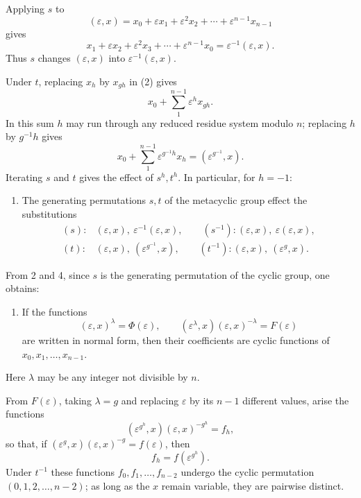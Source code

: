 \documentclass[11pt]{article}
\begin{document}
Applying $s$ to
\begin{equation}\tag{2}
  (\varepsilon,x)=x_0+\varepsilon x_1+\varepsilon^2x_2+\cdots+\varepsilon^{n-1}x_{n-1}
\end{equation}
gives
\[
  x_1+\varepsilon x_2+\varepsilon^2x_3+\cdots+\varepsilon^{n-1}x_0
  =\varepsilon^{-1}(\varepsilon,x).
\]
Thus $s$ changes $(\varepsilon,x)$ into $\varepsilon^{-1}(\varepsilon,x)$.

Under $t$, replacing $x_h$ by $x_{gh}$ in (2) gives
\begin{equation}\tag{3}
  x_0+\sum_{1}^{n-1}\varepsilon^h x_{gh}.
\end{equation}
In this sum $h$ may run through any reduced residue system modulo $n$; replacing $h$ by $g^{-1}h$ gives
\[
  x_0+\sum_{1}^{n-1}\varepsilon^{g^{-1}h}x_h=(\varepsilon^{g^{-1}},x).
\]
Iterating $s$ and $t$ gives the effect of $s^h,t^h$. In particular, for $h=-1$:

\begin{enumerate}[resume,label=\arabic*.]
\item The generating permutations $s,t$ of the metacyclic group effect the substitutions
\[
\begin{array}{ll}
(s):&(\varepsilon,x),\ \varepsilon^{-1}(\varepsilon,x),\qquad
(s^{-1}): (\varepsilon,x),\ \varepsilon(\varepsilon,x),\\[2mm]
(t):&(\varepsilon,x),\ (\varepsilon^{g^{-1}},x),\qquad
(t^{-1}): (\varepsilon,x),\ (\varepsilon^{g},x).
\end{array}
\]
\end{enumerate}

From 2 and 4, since $s$ is the generating permutation of the cyclic group, one obtains:

\begin{enumerate}[resume,label=\arabic*.]
\item If the functions
\begin{equation}\tag{4}
  (\varepsilon,x)^\lambda=\Phi(\varepsilon),\qquad
  (\varepsilon^\lambda,x)(\varepsilon,x)^{-\lambda}=F(\varepsilon)
\end{equation}
are written in normal form, then their coefficients are cyclic functions of $x_0,x_1,\ldots,x_{n-1}$.
\end{enumerate}
Here $\lambda$ may be any integer not divisible by $n$.

From $F(\varepsilon)$, taking $\lambda=g$ and replacing $\varepsilon$ by its $n-1$ different values, arise the functions
\begin{equation}\tag{5}
  (\varepsilon^{g^h},x)(\varepsilon,x)^{-g^h}=f_h,
\end{equation}
so that, if $(\varepsilon^g,x)(\varepsilon,x)^{-g}=f(\varepsilon)$, then
\begin{equation}\tag{6}
  f_h=f(\varepsilon^{g^h}).
\end{equation}
Under $t^{-1}$ these functions $f_0,f_1,\ldots,f_{n-2}$ undergo the cyclic permutation $(0,1,2,\ldots,n-2)$; as long as the $x$ remain variable, they are pairwise distinct.
\end{document}
